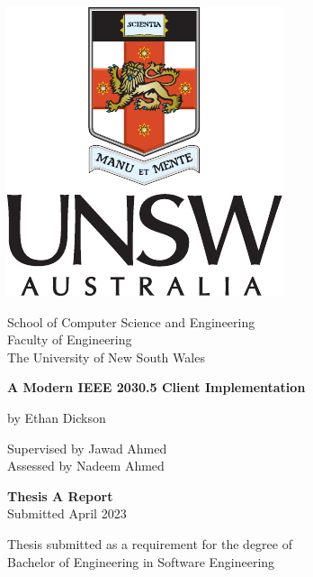 \documentclass[]{unswthesis}
\begin{document}
\begin{titlepage}

\vspace*{\fill}

\begin{center}
    \includegraphics{crest}
\end{center}

\vspace{0.5cm}

\begin{center}
    \Large{}School of Computer Science and Engineering\\
    Faculty of Engineering\\
    The University of New South Wales
\end{center}

\vspace{1cm}

\begin{center}
    \Huge \textbf{A Modern IEEE 2030.5 Client Implementation}
\end{center}

\vspace{0.1cm}

\begin{center}
    \Large{}
    by Ethan Dickson\\
    
    \vspace{0.5cm}
    
    Supervised by Jawad Ahmed\\
    Assessed by Nadeem Ahmed
\end{center}

\vspace{0.5cm}

\begin{center}
    \textbf{Thesis A Report}\\
    Submitted April 2023
    
    \vspace{0.5cm}
    
    Thesis submitted as a requirement for the degree of\\
    Bachelor of Engineering in Software Engineering
\end{center}

\vspace*{\fill}

\end{titlepage}
\end{document}
